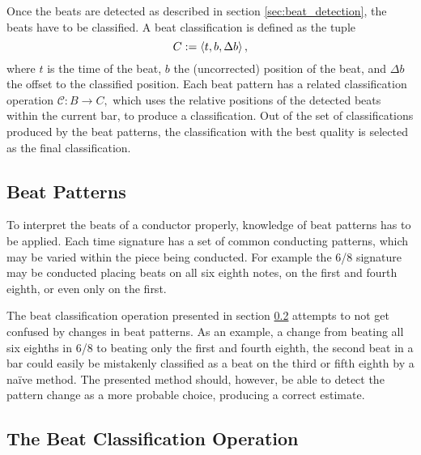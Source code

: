 Once the beats are detected as described
in section \ref{sec:beat_detection},
the beats have to be classified.
A beat classification is defined as the tuple
\[
C := \left \langle t, b, \Delta b \right \rangle ,
\]
where $t$ is the time of the beat,
$b$ the (uncorrected) position of the beat,
and $\Delta b$ the offset to the classified position.
Each beat pattern has a related
classification operation $ \mathcal{C} : B \rightarrow C, $
which uses the relative positions of the detected beats
within the current bar,
to produce a classification.
Out of the set of classifications produced by the beat patterns,
the classification with the best quality is
selected as the final classification.

\subsection{Beat Patterns}

To interpret the beats of a conductor properly,
knowledge of beat patterns has to be applied.
Each time signature has a set of common conducting patterns,
which may be varied within the piece being conducted.
For example the 6/8 signature may be conducted
placing beats on
all six eighth notes,
on the first and fourth eighth,
or even only on the first.

The beat classification operation presented
in section \ref{sec:beat_classification_op}
attempts to not get confused by changes in beat patterns.
As an example, a change from beating all six eighths in 6/8
to beating only the first and fourth eighth,
the second beat in a bar could easily be mistakenly classified
as a beat on the third or fifth eighth
by a na\"ive method.
The presented method should, however,
be able to detect the pattern change as
a more probable choice,
producing a correct estimate.

\subsection{The Beat Classification Operation}
\label{sec:beat_classification_op}

